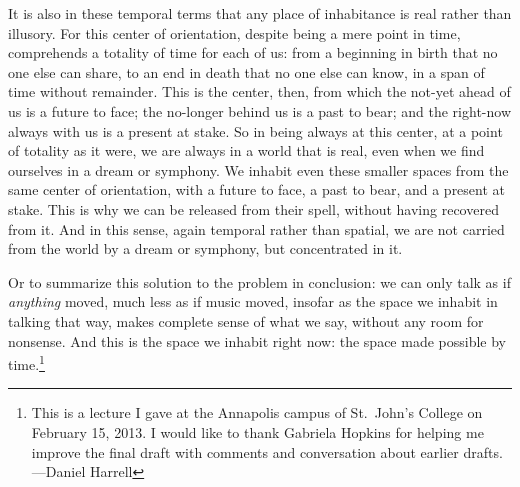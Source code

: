 \documentclass[12pt]{memoir}
\begin{document}
It is also in these temporal terms that any place
of inhabitance is real rather than illusory. For
this center of orientation, despite being a mere
point in time, comprehends a totality of time
for each of us: from a beginning in birth that
no one else can share, to an end in death that
no one else can know, in a span of time without
remainder. This is the center, then, from which
the not-yet ahead of us is a future to face; the
no-longer behind us is a past to bear; and the
right-now always with us is a present at stake.
So in being always at this center, at a point of
totality as it were, we are always in a world that
is real, even when we find ourselves in a dream
or symphony. We inhabit even these smaller spaces
from the same center of orientation, with a future
to face, a past to bear, and a present at stake.
This is why we can be released from their spell,
without having recovered from it. And in this
sense, again temporal rather than spatial, we are
not carried from the world by a dream or symphony,
but concentrated in it.

Or to summarize this solution to the problem in
conclusion: we can only talk as if \emph{anything}
moved, much less as if music moved, insofar
as the space we inhabit in talking that way,
makes complete sense of what we say, without
any room for nonsense. And this is the space we
inhabit right now: the space made possible by
time.\footnote{This is a lecture I gave at the
Annapolis campus of St.~John's College on February
15, 2013. I would like to thank Gabriela Hopkins
for helping me improve the final draft with
comments and conversation about earlier drafts.
---Daniel Harrell}
  
  
\end{document}
